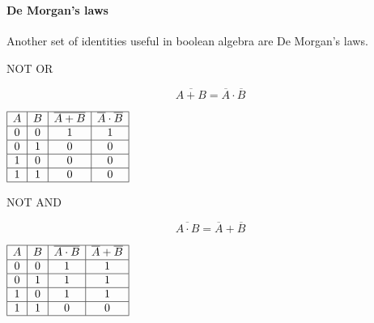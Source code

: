 \documentclass[mathserif]{beamer}
\newenvironment{compactmath}[1][\normalsize]%
	{\begin{minipage}{\textwidth}\vspace{-0.75\baselineskip}#1\begin{equation*}}
	{\end{equation*}\end{minipage}}
\newenvironment{namedframe}[1]%
	{\begin{frame}\frametitle{\secname}\framesubtitle{#1}}
	{\end{frame}}
\newcommand{\negate}[1]{\overline{#1}}
\begin{document}
	\begin{namedframe}{De Morgan's laws}
		Another set of identities useful in boolean algebra are De Morgan's laws.
		\begin{center}
			\pause
			\begin{minipage}{0.425\textwidth}
				\centering
				\begin{block}{NOT OR}
					\begin{compactmath}
						\negate{A + B} = \negate{A} \cdot \negate{B}
					\end{compactmath}
				\end{block}
				\begin{math}
					\begin{array}{|c|c|c|c|}
						\hline
						A & B & \negate{A + B} & \negate{A} \cdot \negate{B}\\\hline
						0 & 0 &  1             &  1                         \\\hline
						0 & 1 &  0             &  0                         \\\hline
						1 & 0 &  0             &  0                         \\\hline
						1 & 1 &  0             &  0                         \\\hline
					\end{array}
				\end{math}
			\end{minipage}
			\hspace{0.025\textwidth}
			\pause
			\begin{minipage}{0.425\textwidth}
				\centering
				\begin{block}{NOT AND}
					\begin{compactmath}
						\negate{A \cdot B} = \negate{A} + \negate{B}
					\end{compactmath}
				\end{block}
				\begin{math}
					\begin{array}{|c|c|c|c|}
						\hline
						A & B & \negate{A \cdot B} & \negate{A} + \negate{B}\\\hline
						0 & 0 &  1             &  1                         \\\hline
						0 & 1 &  1             &  1                         \\\hline
						1 & 0 &  1             &  1                         \\\hline
						1 & 1 &  0             &  0                         \\\hline
					\end{array}
				\end{math}
			\end{minipage}
		\end{center}
	\end{namedframe}
\end{document}
